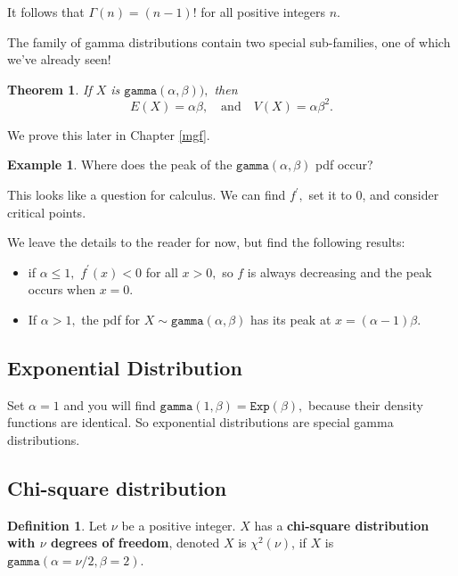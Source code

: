 \documentclass[
]{book}
\providecommand{\tightlist}{%
  \setlength{\itemsep}{0pt}\setlength{\parskip}{0pt}}
\newtheorem{theorem}{Theorem}[chapter]
\theoremstyle{definition}
\newtheorem{definition}{Definition}[chapter]
\theoremstyle{definition}
\newtheorem{example}{Example}[chapter]
\theoremstyle{definition}
\theoremstyle{definition}
\theoremstyle{remark}
\begin{document}
It follows that \(\Gamma(n) = (n-1)!\) for all positive integers \(n\).

The family of gamma distributions contain two special sub-families, one of which we've already seen!

\begin{theorem}
\protect\hypertarget{thm:gamma-EandV}{}\label{thm:gamma-EandV}If \(X\) is \(\texttt{gamma}(\alpha,\beta)),\) then \[E(X) = \alpha\beta, ~~~ \text{ and } ~~~ V(X) = \alpha\beta^2.\]
\end{theorem}

We prove this later in Chapter \ref{mgf}.

\begin{example}

Where does the peak of the \(\texttt{gamma}(\alpha,\beta)\) pdf occur?

This looks like a question for calculus. We can find \(f^\prime,\) set it to 0, and consider critical points.

We leave the details to the reader for now, but find the following results:

\begin{itemize}
\tightlist
\item
  if \(\alpha \leq 1,\) \(f^\prime(x) < 0\) for all \(x > 0,\) so \(f\) is always decreasing and the peak occurs when \(x = 0\).
\item
  If \(\alpha > 1,\) the pdf for \(X \sim \texttt{gamma}(\alpha, \beta)\) has its peak at \(x = (\alpha-1)\beta.\)
\end{itemize}

\end{example}

\subsection{Exponential Distribution}\label{exponential-distribution-1}

Set \(\alpha = 1\) and you will find \(\texttt{gamma}(1,\beta) = \texttt{Exp}(\beta),\)
because their density functions are identical. So exponential distributions are special gamma distributions.

\subsection{Chi-square distribution}\label{chi-square-distribution}

\begin{definition}
\protect\hypertarget{def:chi-square}{}\label{def:chi-square}Let \(\nu\) be a positive integer. \(X\) has a \textbf{chi-square distribution with \(\nu\) degrees of freedom}, denoted \(X\) is \(\chi^2(\nu)\), if \(X\) is \(\texttt{gamma}(\alpha = \nu/2, \beta = 2).\)
\end{definition}
\end{document}
